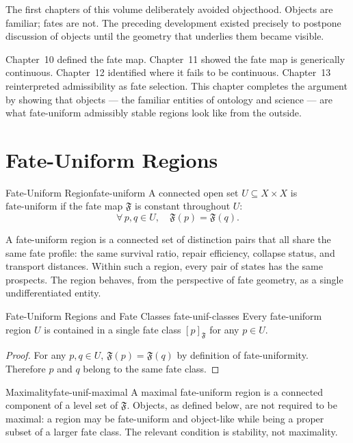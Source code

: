 \documentclass[12pt,twoside,openright]{book}
\newcommand{\distPairs}{X\times X}
\newcommand{\fateMap}{\mathfrak{F}}
\newcommand{\fateClass}[1]{[#1]_{\mathfrak{F}}}
\newcommand{\fateUnif}{\text{fate-uniform}}
\providecommand{\fateUnif}{\text{fate-uniform}}
\providecommand{\fateClass}[1]{[#1]_{\mathfrak{F}}}
\begin{document}
The first chapters of this volume deliberately avoided
objecthood. Objects are familiar; fates are not. The preceding
development existed precisely to postpone discussion of objects
until the geometry that underlies them became visible.

Chapter~10 defined the fate map. Chapter~11 showed the fate
map is generically continuous. Chapter~12 identified where it
fails to be continuous. Chapter~13 reinterpreted admissibility
as fate selection. This chapter completes the argument by
showing that objects --- the familiar entities of ontology and
science --- are what fate-uniform admissibly stable regions
look like from the outside.

\section{Fate-Uniform Regions}

\begin{definition}{Fate-Uniform Region}{fate-uniform}
A connected open set $U\subseteq\distPairs$ is
\emph{$\fateUnif$} if the fate map $\fateMap$ is constant
throughout $U$:
\[
  \forall\, p,q\in U,\quad \fateMap(p)=\fateMap(q).
\]
\end{definition}

A fate-uniform region is a connected set of distinction pairs
that all share the same fate profile: the same survival ratio,
repair efficiency, collapse status, and transport distances.
Within such a region, every pair of states has the same
prospects. The region behaves, from the perspective of fate
geometry, as a single undifferentiated entity.

\begin{proposition}{Fate-Uniform Regions and Fate Classes}%
  {fate-unif-classes}
Every fate-uniform region $U$ is contained in a single fate
class $\fateClass{p}$ for any $p\in U$.
\begin{proof}
For any $p,q\in U$, $\fateMap(p)=\fateMap(q)$ by definition
of fate-uniformity. Therefore $p$ and $q$ belong to the same
fate class.
\end{proof}
\end{proposition}

\begin{remark}{Maximality}{fate-unif-maximal}
A maximal fate-uniform region is a connected component of a
level set of $\fateMap$. Objects, as defined below, are not
required to be maximal: a region may be fate-uniform and
object-like while being a proper subset of a larger fate class.
The relevant condition is stability, not maximality.
\end{remark}
\end{document}
